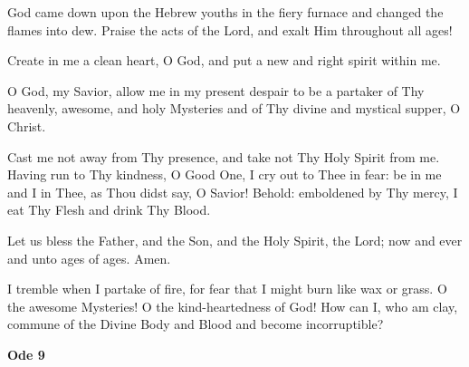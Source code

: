 \begin{hang}
\noindent{}God came down upon the Hebrew youths in the fiery furnace and changed the flames into dew. Praise the acts of the Lord, and exalt Him throughout all ages!

Create in me a clean heart, O God, and put a new and right spirit within me.

O God, my Savior, allow me in my present despair to be a partaker of Thy heavenly, awesome, and holy Mysteries and of Thy divine and mystical supper, O Christ.

Cast me not away from Thy presence, and take not Thy Holy Spirit from me. Having run to Thy kindness, O Good One, I cry out to Thee in fear: be in me and I in Thee, as Thou didst say, O Savior! Behold: emboldened by Thy mercy, I eat Thy Flesh and drink Thy Blood.

Let us bless the Father, and the Son, and the Holy Spirit, the Lord; now and ever and unto ages of ages. Amen.

I tremble when I partake of fire, for fear that I might burn like wax or grass. O the awesome Mysteries! O the kind-heartedness of God! How can I, who am clay, commune of the Divine Body and Blood and become incorruptible?

\end{hang}

\begin{center}
	\textbf{Ode 9}
\end{center}

